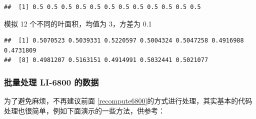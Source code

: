 \documentclass[
]{krantz}
\makeatletter
\newenvironment{Shaded}{\begin{snugshade}}{\end{snugshade}}
\newcommand{\AttributeTok}[1]{\textcolor[rgb]{0.77,0.63,0.00}{#1}}
\newcommand{\DecValTok}[1]{\textcolor[rgb]{0.00,0.00,0.81}{#1}}
\newcommand{\FloatTok}[1]{\textcolor[rgb]{0.00,0.00,0.81}{#1}}
\newcommand{\FunctionTok}[1]{\textcolor[rgb]{0.00,0.00,0.00}{#1}}
\newcommand{\NormalTok}[1]{#1}
\newcommand{\OtherTok}[1]{\textcolor[rgb]{0.56,0.35,0.01}{#1}}
\newcommand{\SpecialCharTok}[1]{\textcolor[rgb]{0.00,0.00,0.00}{#1}}
\newcommand{\StringTok}[1]{\textcolor[rgb]{0.31,0.60,0.02}{#1}}
\newenvironment{kframe}{%
\medskip{}
\setlength{\fboxsep}{.8em}
 \def\at@end@of@kframe{}%
 \ifinner\ifhmode%
  \def\at@end@of@kframe{\end{minipage}}%
  \begin{minipage}{\columnwidth}%
 \fi\fi%
 \def\FrameCommand##1{\hskip\@totalleftmargin \hskip-\fboxsep
 \colorbox{shadecolor}{##1}\hskip-\fboxsep
     \hskip-\linewidth \hskip-\@totalleftmargin \hskip\columnwidth}%
 \MakeFramed {\advance\hsize-\width
   \@totalleftmargin\z@ \linewidth\hsize
   \@setminipage}}%
 {\par\unskip\endMakeFramed%
 \at@end@of@kframe}
\renewenvironment{Shaded}{\begin{kframe}}{\end{kframe}}
\makeatother
\begin{document}
\begin{verbatim}
##  [1] 0.5 0.5 0.5 0.5 0.5 0.5 0.5 0.5 0.5 0.5 0.5 0.5
\end{verbatim}

模拟 12 个不同的叶面积，均值为 3，方差为 0.1

\begin{Shaded}
\end{Shaded}

\begin{verbatim}
##  [1] 0.5070523 0.5039331 0.5220597 0.5004324 0.5047258 0.4916988 0.4731809
##  [8] 0.4981207 0.5163151 0.4914991 0.5032441 0.5021077
\end{verbatim}

\hypertarget{batch-6800-xlsx}{%
\subsubsection{批量处理 LI-6800 的数据}\label{batch-6800-xlsx}}

为了避免麻烦，不再建议前面 \ref{recompute6800}的方式进行处理，其实基本的代码处理也很简单，例如下面演示的一些方法，供参考：
\end{document}
